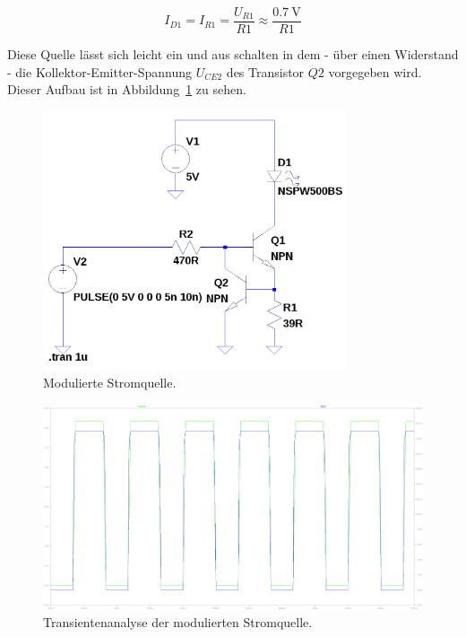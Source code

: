 \documentclass[12pt,a4paper]{article}
\begin{document}
\begin{equation}
I_{D1} = I_{R1} = \frac{U_{R1}}{R1} \approx \frac{\SI{0.7}{\volt}}{R1}
\end{equation}

Diese Quelle lässt sich leicht ein und aus schalten in dem - über einen Widerstand - die Kollektor-Emitter-Spannung $U_{CE2}$ des Transistor $Q2$ vorgegeben wird. Dieser Aufbau ist in Abbildung~\ref{fig:modulated_current_source} zu sehen.

\begin{figure}[H]
  \centering
    \includegraphics[width=0.8\textwidth]{../spice/modulated_current_source.png}
  \caption{Modulierte Stromquelle.}
  \label{fig:modulated_current_source}
\end{figure}

\begin{figure}[H]
  \centering
    \includegraphics[width=1.0\textwidth]{../spice/current_input_v_current_out_trans.png}
  \caption{Transientenanalyse der modulierten Stromquelle.}
  \label{fig:modulated_current_source_plot}
\end{figure}
\end{document}
